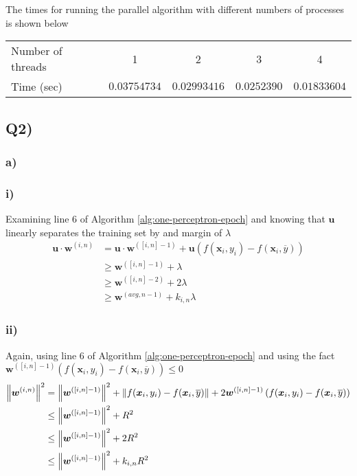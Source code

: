 The times for running the parallel algorithm with different numbers of processes is shown below
\begin{table}[h!!!]
\begin{tabular}{l|c|c|c|c}
Number of threads & 1 & 2 & 3 & 4 \\ \cline{2-5} 
Time (sec)        & $0.03754734$ & $0.02993416$ & $0.0252390$ & $0.01833604$
\end{tabular}
\end{table}

\subsection*{{\bf Q2)}}
\subsubsection*{{\bf a)}}
\subsubsection*{{\bf i)}}
Examining line $6$ of Algorithm \ref{alg:one-perceptron-epoch} and knowing that $\bm{u}$ linearly separates the training set by and margin of $\lambda$
\begin{align*}
    \bm{u} \cdot \bm{w}^{(i,n)} &= \bm{u} \cdot \bm{w}^{([i,n] - 1)} + \bm{u} \left( f (\bm{x}_{i}, y_{i}) -  f (\bm{x}_{i}, \overline{y}) \right) \\
    &\geq \bm{w}^{([i,n] - 1)} + \lambda \\
    &\geq \bm{w}^{([i,n] - 2)} + 2 \lambda \\
    &\geq \bm{w}^{(avg, n-1)} + k_{i,n} \lambda
\end{align*}

\subsubsection*{{\bf ii)}}
Again, using line $6$ of Algorithm \ref{alg:one-perceptron-epoch} and using the fact $\bm{w}^{([i,n] - 1)} \left( f (\bm{x}_{i}, y_{i}) -  f (\bm{x}_{i}, \overline{y}) \right) \leq 0$
\begin{align*}
    \left\lVert\bm{w}^{(i,n)}\right\rVert^2 &= \left\lVert\bm{w}^{([i,n] - 1)}\right\rVert^2 + \left\lVert f (\bm{x}_{i}, y_{i}) -  f (\bm{x}_{i}, \overline{y})\right\rVert + 2 \bm{w}^{([i,n] - 1)} \left( f (\bm{x}_{i}, y_{i}) -  f (\bm{x}_{i}, \overline{y}) \right) \\
    &\leq \left\lVert\bm{w}^{([i,n] - 1)}\right\rVert^2 + R^2 \\
    &\leq \left\lVert\bm{w}^{([i,n] - 1)}\right\rVert^2 + 2R^2 \\
    &\leq \left\lVert\bm{w}^{([i,n] - 1)}\right\rVert^2 + k_{i,n} R^2
\end{align*}

